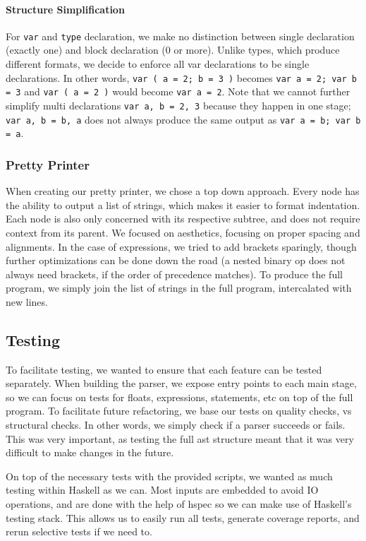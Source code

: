 \documentclass[11pt]{article}
\begin{document}
\paragraph{Structure Simplification}
For \texttt{var} and \texttt{type} declaration, we make no distinction
between single declaration (exactly one) and block declaration (0 or
more). Unlike types, which produce different formats, we decide to
enforce all var declarations to be single declarations. In other
words, \texttt{var ( a = 2; b = 3 )} becomes \texttt{var a = 2; var b = 3}
and \texttt{var ( a = 2 )} would become \texttt{var a = 2}. Note
that we cannot further simplify multi declarations \texttt{var a, b
  = 2, 3} because they happen in one stage;
  \texttt{var a, b = b, a} does not always produce the same output as
  \texttt{var a = b; var b = a}.

\subsubsection{Pretty Printer}
When creating our pretty printer, we chose a top down approach.  Every
node has the ability to output a list of strings, which makes it
easier to format indentation. Each node is also only concerned with
its respective subtree, and does not require context from its
parent. We focused on aesthetics, focusing on proper spacing and
alignments. In the case of expressions, we tried to add brackets
sparingly, though further optimizations can be done down the road (a
nested binary op does not always need brackets, if the order of
precedence matches). To produce the full program, we simply join the
list of strings in the full program, intercalated with new lines.

\subsection{Testing}

To facilitate testing, we wanted to ensure that each feature can
be tested separately.
When building the parser, we expose entry points to each main stage,
so we can focus on tests for floats, expressions, statements, etc
on top of the full program.
To facilitate future refactoring, we base our tests on quality checks, vs structural checks.
In other words, we simply check if a parser succeeds or fails.
This was very important, as testing the full ast structure meant that
it was very difficult to make changes in the future.

On top of the necessary tests with the provided scripts, we wanted as much
testing within Haskell as we can. Most inputs are embedded to avoid IO operations, and are done with the help of hspec so we can make use of Haskell's testing stack. This allows us to easily run all tests,
generate coverage reports, and rerun selective tests if we need to.
\end{document}
